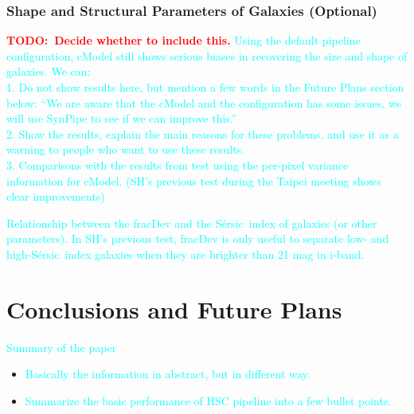 \documentclass[preprint]{aastex}
\def\ser{{S\'{e}rsic\ }}
\newcommand{\todo}[1]{\textcolor{red}{\textbf{TODO:~#1}}}
\newcommand{\plan}[1]{\textcolor{cyan}{#1}}
\begin{document}
\subsubsection{Shape and Structural Parameters of Galaxies (Optional)}
    
    \todo{Decide whether to include this.}
    \plan{Using the default pipeline configuration, cModel still shows serious biases in 
          recovering the size and shape of galaxies.  We can: \\
          1. Do not show results here, but mention a few words in the Future Plans section 
             below: ``We are aware that the cModel and the configuration has some issues, 
             we will use SynPipe to see if we can improve this.'' \\
          2. Show the results, explain the main reasons for these problems, and use it as 
             a warning to people who want to use these results. \\
          3. Comparisons with the results from test using the per-pixel variance information 
             for cModel.  (SH's previous test during the Taipei meeting shows clear 
             improvements)
          }
          
    \plan{Relationship between the fracDev and the \ser index of galaxies (or other parameters).  
          In SH's previous test, fracDev is only useful to separate low- and high-\ser index 
          galaxies when they are brighter than 21 mag in i-band.}
    

\section{Conclusions and Future Plans}

    \plan{Summary of the paper}
    \begin{itemize}
        \item \plan{Basically the information in abstract, but in different way.}
        \item \plan{Summarize the basic performance of HSC pipeline into a few 
                    bullet points.} 
    \end{itemize}
    
\end{document}
